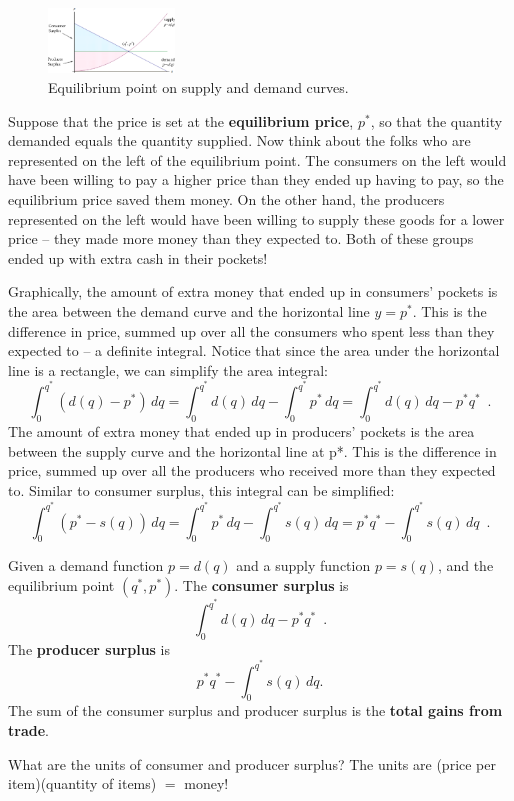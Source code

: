 \begin{figure}[!ht]
  \centering
    \includegraphics[width=0.3\textwidth]{img/chap5/image063.png}
    \caption{Equilibrium point on supply and demand curves.}
    \label{fig:5-8-equilibrium}
\end{figure}
Suppose that the price is set at the {\bf equilibrium price}, $p^{*}$, so that the quantity demanded equals the quantity supplied. Now think about the folks who are represented on the left of the equilibrium point. The consumers on the left would have been willing to pay a higher price than they ended up having to pay, so the equilibrium price saved them money. On the other hand, the producers represented on the left would have been willing to supply these goods for a lower price -- they made more money than they expected to. Both of these groups ended up with extra cash in their pockets!

Graphically, the amount of extra money that ended up in consumers' pockets is the area between the demand curve and the horizontal line $y = p^{*}$. This is the difference in price, summed up over all the consumers who spent less than they expected to -- a definite integral. Notice that since the area under the horizontal line is a rectangle, we can simplify the area integral:
$$\int_0^{q^{*}}(d(q)-p^{*})\,dq = \int_0^{q^{*}}d(q)\,dq-\int_0^{q^{*}}p^{*}\,dq = \int_0^{q^{*}}d(q)\,dq - p^{*}q^{*} \enspace .$$
The amount of extra money that ended up in producers' pockets is the area between the supply curve and the horizontal line at p*. This is the difference in price, summed up over all the producers who received more than they expected to. Similar to consumer surplus, this integral can be simplified:
$$\int_0^{q^{*}}(p^{*} - s(q))\,dq = \int_0^{q^{*}}p^{*}\,dq - \int_0^{q^{*}}s(q)\,dq = p^{*}q^{*} - \int_0^{q^{*}}s(q)\,dq \enspace .$$
\begin{definition}
Given a demand function $p=d(q)$ and a supply function $p=s(q)$, and the equilibrium point $(q^{*},p^{*})$.
The {\bf consumer surplus} is
$$\int_0^{q^{*}}d(q)\,dq - p^{*}q^{*} \enspace .$$
The {\bf producer surplus} is
$$p^{*}q^{*} - \int_0^{q^{*}}s(q)\,dq.$$
The sum of the consumer surplus and producer surplus is the {\bf total gains from trade}.
\end{definition}
What are the units of consumer and producer surplus? The units are (price per item)(quantity of items) $=$ money!

